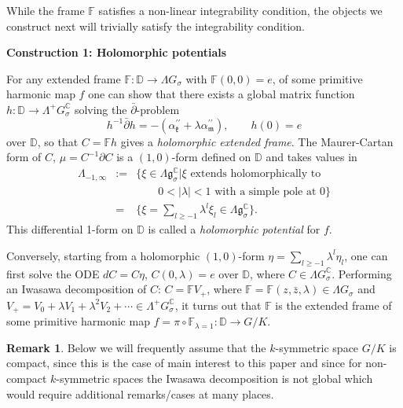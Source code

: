 \documentclass[a4paper,11pt]{amsart}
\theoremstyle{definition}
\newtheorem{remark}{Remark}
\numberwithin{equation}{section}
\newcommand{\D}{\mathbb{D}}
\newcommand{\F}{\mathbb{F}}
\begin{document}
While the frame $\F$ satisfies a non-linear integrability condition, the objects we construct next will trivially satisfy the integrability condition.
\vspace{2mm}

{\bf Construction 1: Holomorphic potentials}
\vspace{2mm}

For any extended frame $\F : \D\rightarrow \Lambda G_{\sigma}$ with $\F(0, 0)=e$, of some primitive harmonic map $f$ one can show that there exists a global matrix function
$h: \D\rightarrow \Lambda^{+}G_{\sigma}^{\mathbb C}$ solving the $\bar{\partial}$-problem
\begin{equation}
 h^{-1}\bar\partial h =-(\alpha_{\mathfrak k}^{\prime\prime}+\lambda \alpha_{\mathfrak m}^{\prime \prime} ), \quad\quad
 h(0)=e
\end{equation}
 over   $\D$, so that $C=\F h$ gives a \emph{holomorphic 
extended frame}. The Maurer-Cartan form of $C$,  
$\mu=C^{-1}\partial C$  is a $(1,0)$-form defined on $\D$ and takes values in 
\begin{eqnarray*}
\Lambda_{-1,\infty}&:=&\{\xi\in \Lambda \mathfrak{g}_{\sigma}^{\mathbb C} | \xi \text{ extends holomorphically to } \\
&& \quad\quad 0<|\lambda|<1 
\text{ with a simple pole at } 0\}\\
&=&\{\xi=\sum_{l\geq -1} \lambda^l \xi_l\in \Lambda \mathfrak{g}_{\sigma}^{\mathbb C}\}. 
\end{eqnarray*}
This differential 1-form on $\D$ is called a \emph{holomorphic potential} for $f$.

Conversely, starting from a holomorphic $(1,0)$-form $\eta=\sum_{l\geq -1} \lambda^l \eta_l$, one can first solve the ODE $dC=C\eta$, $C(0, \lambda) = e$ over  $\D$, where $C\in \Lambda G^{\mathbb C}_{\sigma}$. Performing an Iwasawa decomposition of $C$: $C={\mathbb F}V_{+}$,
where $\mathbb{F}=\mathbb{F}(z, \bar{z},  \lambda) \in \Lambda G_{\sigma}$
and $V_{+}=V_0+\lambda V_1+\lambda^2 V_2+\cdots \in \Lambda^+ G^{\mathbb C}_{\sigma}$, it turns out that $\F$ is the extended frame of some primitive harmonic map $f=\pi\circ \F_{\lambda=1}:\D\rightarrow G/K.$

\begin{remark}
Below we will frequently assume that the $k$-symmetric space $G/K$ is compact, since this is the case of main interest to this paper and since for non-compact $k$-symmetric spaces the Iwasawa decomposition is not global which would require additional remarks/cases at many places.
\end{remark}
\end{document}
